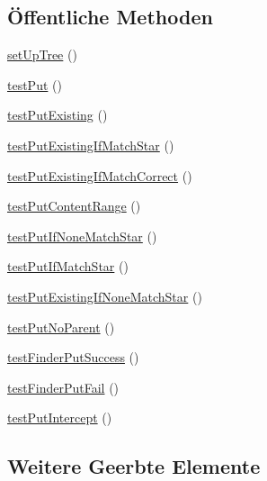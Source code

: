 \subsection*{Öffentliche Methoden}
\begin{DoxyCompactItemize}
\item 
\mbox{\hyperlink{class_sabre_1_1_d_a_v_1_1_http_put_test_a65a68f896f853cf749a35b2c89c4cf56}{set\+Up\+Tree}} ()
\item 
\mbox{\hyperlink{class_sabre_1_1_d_a_v_1_1_http_put_test_a05fa4499976b8151b58fc58de7f71fdb}{test\+Put}} ()
\item 
\mbox{\hyperlink{class_sabre_1_1_d_a_v_1_1_http_put_test_a251a4be91f59d2e484cf5a9d43588943}{test\+Put\+Existing}} ()
\item 
\mbox{\hyperlink{class_sabre_1_1_d_a_v_1_1_http_put_test_a0a3f9a74742b21c7a29469ce1e9fc11b}{test\+Put\+Existing\+If\+Match\+Star}} ()
\item 
\mbox{\hyperlink{class_sabre_1_1_d_a_v_1_1_http_put_test_a61d80dafe61c8debc602957761b59dfb}{test\+Put\+Existing\+If\+Match\+Correct}} ()
\item 
\mbox{\hyperlink{class_sabre_1_1_d_a_v_1_1_http_put_test_aef4b187a05add47e008397b03d54941a}{test\+Put\+Content\+Range}} ()
\item 
\mbox{\hyperlink{class_sabre_1_1_d_a_v_1_1_http_put_test_a0f8a67cb8446711cf460dde13cdde229}{test\+Put\+If\+None\+Match\+Star}} ()
\item 
\mbox{\hyperlink{class_sabre_1_1_d_a_v_1_1_http_put_test_a791e3233ab00cd4f5d33edd5c04c1259}{test\+Put\+If\+Match\+Star}} ()
\item 
\mbox{\hyperlink{class_sabre_1_1_d_a_v_1_1_http_put_test_aa424005eba5804909e17747a9c62ecec}{test\+Put\+Existing\+If\+None\+Match\+Star}} ()
\item 
\mbox{\hyperlink{class_sabre_1_1_d_a_v_1_1_http_put_test_ac2a7f4b6ffdf26168d1862c2ba65669e}{test\+Put\+No\+Parent}} ()
\item 
\mbox{\hyperlink{class_sabre_1_1_d_a_v_1_1_http_put_test_ac2717346a9ea93187de39b16cb7596e6}{test\+Finder\+Put\+Success}} ()
\item 
\mbox{\hyperlink{class_sabre_1_1_d_a_v_1_1_http_put_test_a9b73170ecebaed6c945361bd5dc1cf9d}{test\+Finder\+Put\+Fail}} ()
\item 
\mbox{\hyperlink{class_sabre_1_1_d_a_v_1_1_http_put_test_a577bba82c6c7b5e3064cfcfafa57e0e2}{test\+Put\+Intercept}} ()
\end{DoxyCompactItemize}
\subsection*{Weitere Geerbte Elemente}


